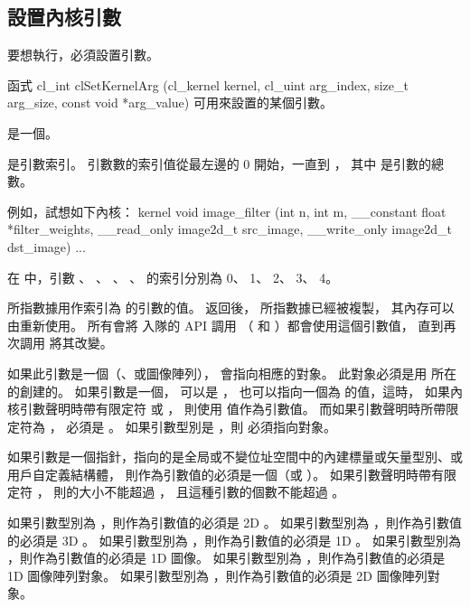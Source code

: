 \subsection{設置內核引數}

要想執行，必須設置引數。

函式
\startCLFUNC
cl_int clSetKernelArg (cl_kernel kernel,
			cl_uint arg_index,
			size_t arg_size,
			const void *arg_value)
\stopCLFUNC
可用來設置的某個引數。

 是一個。

 是引數索引。
引數數的索引值從最左邊的 0 開始，一直到 ，
其中  是引數的總數。

例如，試想如下內核：
\startclc
kernel void
image_filter (int n, int m,
		__constant float *filter_weights,
		__read_only image2d_t src_image,
		__write_only image2d_t dst_image)
{
	...
}
\stopclc

在  中，引數 、 、 、
、  的索引分別為 0、 1、 2、 3、 4。

 所指數據用作索引為  的引數的值。
 返回後，  所指數據已經被複製，
其內存可以由重新使用。
所有會將  入隊的 API 調用
（  和 ）都會使用這個引數值，
直到再次調用  將其改變。

如果此引數是一個（、或圖像陣列），
 會指向相應的對象。
此對象必須是用  所在的創建的。
如果引數是一個，  可以是 ，
也可以指向一個為  的值，這時，
如果內核引數聲明時帶有限定符  或 ，
則使用  值作為引數值。
而如果引數聲明時所帶限定符為 ，  必須是 。
如果引數型別是 ，則  必須指向對象。

如果引數是一個指針，指向的是全局或不變位址空間中的內建標量或矢量型別、或用戶自定義結構體，
則作為引數值的必須是一個（或 ）。
如果引數聲明時帶有限定符 ，
則的大小不能超過 ，
且這種引數的個數不能超過 。

如果引數型別為 ，則作為引數值的必須是 2D 。
如果引數型別為 ，則作為引數值的必須是 3D 。
如果引數型別為 ，則作為引數值的必須是 1D 。
如果引數型別為 ，則作為引數值的必須是 1D 圖像。
如果引數型別為 ，則作為引數值的必須是 1D 圖像陣列對象。
如果引數型別為 ，則作為引數值的必須是 2D 圖像陣列對象。

